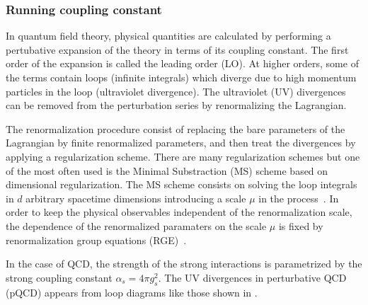 \subsubsection{Running coupling constant}

In quantum field theory, physical quantities are calculated by performing a pertubative expansion of the theory in terms of its coupling constant. The first order of the expansion is called the leading order (LO). At higher orders, some of the terms contain loops (infinite integrals) which diverge due to high momentum particles in the loop (ultraviolet divergence). The ultraviolet (UV) divergences can be removed from the perturbation series by renormalizing the Lagrangian.

The renormalization procedure consist of replacing the bare parameters of the Lagrangian by finite renormalized parameters, and then treat the divergences by applying a regularization scheme. There are many regularization schemes but one of the most often used is the Minimal Substraction (MS) scheme based on dimensional regularization. The MS scheme consists on solving the loop integrals in $d$ arbitrary spacetime dimensions introducing a scale $\mu$ in the process~\cite{Renomalization}. In order to keep the physical observables independent of the renormalization scale, the dependence of the renormalized paramaters on the scale $\mu$ is fixed by renormalization group equations (RGE)~\cite{Renomalization}.

In the case of QCD, the strength of the strong interactions is parametrized by the strong coupling constant $\alpha_{s} = 4{\pi}g_{s}^{2}$. The UV divergences in perturbative QCD (pQCD) appears from loop diagrams like those shown in .

